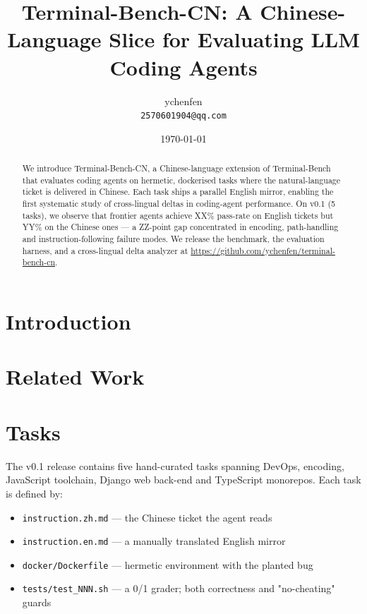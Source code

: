 \documentclass{article}
\title{Terminal-Bench-CN: A Chinese-Language Slice for Evaluating LLM Coding Agents}
\author{ychenfen \\ \texttt{2570601904@qq.com}}
\date{\today}
\begin{document}
\maketitle

\begin{abstract}
We introduce Terminal-Bench-CN, a Chinese-language extension of Terminal-Bench
that evaluates coding agents on hermetic, dockerised tasks where the natural-language
ticket is delivered in Chinese. Each task ships a parallel English mirror, enabling
the first systematic study of cross-lingual deltas in coding-agent performance.
On v0.1 (5 tasks), we observe that frontier agents achieve XX\% pass-rate on
English tickets but YY\% on the Chinese ones — a ZZ-point gap concentrated in
encoding, path-handling and instruction-following failure modes. We release the
benchmark, the evaluation harness, and a cross-lingual delta analyzer at
\url{https://github.com/ychenfen/terminal-bench-cn}.
\end{abstract}

\section{Introduction}


\section{Related Work}

\section{Tasks}
The v0.1 release contains five hand-curated tasks spanning DevOps, encoding,
JavaScript toolchain, Django web back-end and TypeScript monorepos. Each task is
defined by:
\begin{itemize}
  \item \texttt{instruction.zh.md} — the Chinese ticket the agent reads
  \item \texttt{instruction.en.md} — a manually translated English mirror
  \item \texttt{docker/Dockerfile} — hermetic environment with the planted bug
  \item \texttt{tests/test\_NNN.sh} — a 0/1 grader; both correctness and "no-cheating" guards
\end{itemize}
\end{document}
